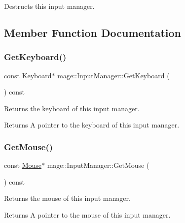 Destructs this input manager. 

\subsection{Member Function Documentation}
\hypertarget{classmage_1_1_input_manager_a2ceb6e20c122f7029cb75b970a11d58d}{}\label{classmage_1_1_input_manager_a2ceb6e20c122f7029cb75b970a11d58d} 
\subsubsection{\texorpdfstring{Get\+Keyboard()}{GetKeyboard()}}
{\footnotesize\ttfamily const \hyperlink{classmage_1_1_keyboard}{Keyboard}$\ast$ mage\+::\+Input\+Manager\+::\+Get\+Keyboard (\begin{DoxyParamCaption}{ }\end{DoxyParamCaption}) const\hspace{0.3cm}{\ttfamily [noexcept]}}

Returns the keyboard of this input manager.

\begin{DoxyReturn}{Returns}
A pointer to the keyboard of this input manager. 
\end{DoxyReturn}
\hypertarget{classmage_1_1_input_manager_aae51ef1fb225466d956f75372f166e38}{}\label{classmage_1_1_input_manager_aae51ef1fb225466d956f75372f166e38} 
\subsubsection{\texorpdfstring{Get\+Mouse()}{GetMouse()}}
{\footnotesize\ttfamily const \hyperlink{classmage_1_1_mouse}{Mouse}$\ast$ mage\+::\+Input\+Manager\+::\+Get\+Mouse (\begin{DoxyParamCaption}{ }\end{DoxyParamCaption}) const\hspace{0.3cm}{\ttfamily [noexcept]}}

Returns the mouse of this input manager.

\begin{DoxyReturn}{Returns}
A pointer to the mouse of this input manager. 
\end{DoxyReturn}
\hypertarget{classmage_1_1_input_manager_aaee6f1acc558620d2cf6313f3eb36a35}{}\label{classmage_1_1_input_manager_aaee6f1acc558620d2cf6313f3eb36a35} 
